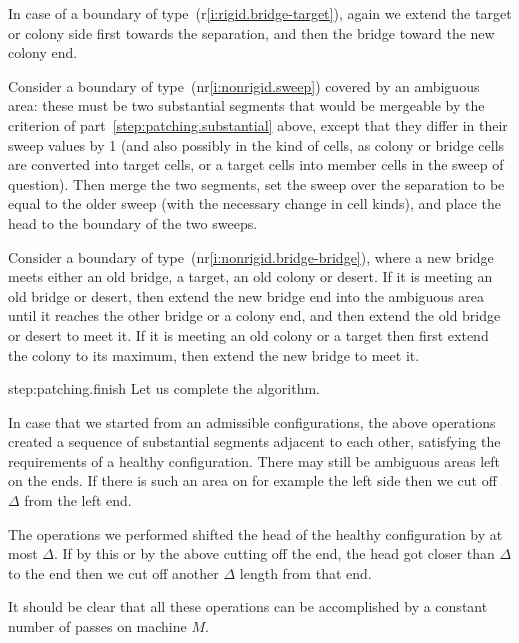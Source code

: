 \documentclass[12pt]{memoir}
\begin{document}
\begin{Proof}
\begin{prooofi}
In case of a boundary of type~(r\ref{i:rigid.bridge-target}),
again we extend the target or colony side first towards the separation,
and then the bridge toward the new colony end.

Consider a boundary of type~(nr\ref{i:nonrigid.sweep}) covered by an ambiguous area:
these must be two substantial segments that would be mergeable by the criterion 
of part~\ref{step:patching.substantial} above, except that they
differ in their sweep values by 1 (and also possibly in the kind of cells,
as colony or bridge cells are converted into target cells, or a target cells into member cells
in the sweep of question).
Then merge the two segments, set the sweep over the separation to be equal
to the older sweep (with the necessary change in cell kinds), 
and place the head to the boundary of the two sweeps.

Consider a boundary of type~(nr\ref{i:nonrigid.bridge-bridge}), where a new bridge
meets either an old bridge, a target, an old colony or desert.
If it is meeting an old bridge or desert, then
extend the new bridge end into the ambiguous area until it reaches the
other bridge or a colony end, and then extend the old bridge or desert to meet it.
If it is meeting an old colony or a target then first extend the colony to its maximum,
then extend the new bridge to meet it.
\end{prooofi} %

\begin{step+}{step:patching.finish}
Let us complete the algorithm.
\end{step+}
\begin{prooofi}
In case that we started from an admissible configurations, the above operations
created a sequence of substantial segments adjacent to each other, satisfying the 
requirements of a healthy configuration.
There may still be ambiguous areas left on the ends.
If there is such an area on for example the left side then we cut off \( \Delta \) 
from the left end.

The operations we performed shifted the head of the healthy configuration by at most
\( \Delta \).
If by this or by the above cutting off the end, the head got closer than \( \Delta \) to the
end then we cut off another \( \Delta \) length from that end.
\end{prooofi} %

It should be clear that all these operations can be accomplished by a constant number of
passes on machine \( M \).


\end{Proof}
\end{document}
